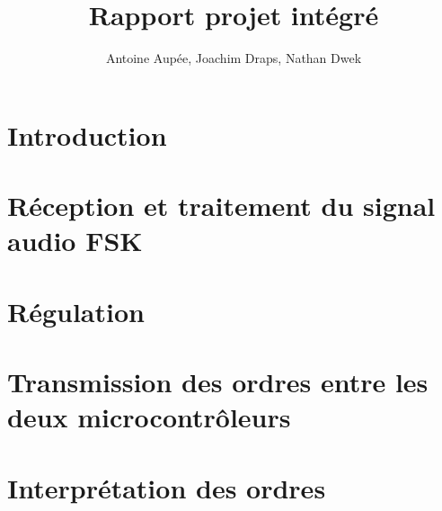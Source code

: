 \documentclass[a4paper, 11pt, frenchb]{report}
\title{Rapport projet intégré}
\author{Antoine Aupée, Joachim Draps, Nathan Dwek}
\begin{document}

\setcounter{page}{2}
\tableofcontents

\chapter{Introduction}


\chapter{Réception et traitement du signal audio FSK}


\chapter{Régulation\label{chap:regul}}


\chapter{Transmission des ordres entre les deux microcontrôleurs}


\chapter{Interprétation des ordres}


\listoffigures
\setcounter{page}{1}

\end{document}
